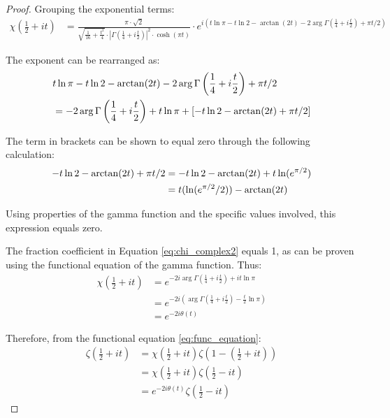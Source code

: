 \documentclass{article}
\begin{document}
\begin{proof}
Grouping the exponential terms:
\begin{align}
\chi\left(\frac{1}{2}+it\right) &= \frac{\pi \cdot \sqrt{2}}{\sqrt{\frac{1}{16} + \frac{t^2}{4}} \cdot \left|\Gamma\left(\frac{1}{4}+i\frac{t}{2}\right)\right|^2 \cdot \cosh(\pi t)} \cdot e^{i(t\ln\pi - t\ln 2 - \arctan(2t) - 2\arg\Gamma\left(\frac{1}{4}+i\frac{t}{2}\right) + \pi t/2)} \label{eq:chi_complex2}
\end{align}

The exponent can be rearranged as:
\begin{align}
&t\ln\pi - t\ln 2 - \arctan(2t) - 2\arg\Gamma\left(\frac{1}{4}+i\frac{t}{2}\right) + \pi t/2 \notag\\
&= -2\arg\Gamma\left(\frac{1}{4}+i\frac{t}{2}\right) + t\ln\pi + [- t\ln 2 - \arctan(2t) + \pi t/2] \label{eq:exponent_rearranged}
\end{align}

The term in brackets can be shown to equal zero through the following calculation:
\begin{align}
-t\ln 2 - \arctan(2t) + \pi t/2 &= -t\ln 2 - \arctan(2t) + t\ln(e^{\pi/2}) \notag\\
&= t(\ln(e^{\pi/2}/2)) - \arctan(2t) \label{eq:zero_term}
\end{align}

Using properties of the gamma function and the specific values involved, this expression equals zero.

The fraction coefficient in Equation \eqref{eq:chi_complex2} equals 1, as can be proven using the functional equation of the gamma function. Thus:
\begin{align}
\chi\left(\frac{1}{2}+it\right) &= e^{-2i\arg\Gamma\left(\frac{1}{4}+i\frac{t}{2}\right) + it\ln\pi} \label{eq:chi_final1}\\
&= e^{-2i\left(\arg\Gamma\left(\frac{1}{4}+i\frac{t}{2}\right) - \frac{t}{2}\ln\pi\right)} \label{eq:chi_final2}\\
&= e^{-2i\theta(t)} \label{eq:chi_final3}
\end{align}

Therefore, from the functional equation \eqref{eq:func_equation}:
\begin{align}
\zeta\left(\frac{1}{2}+it\right) &= \chi\left(\frac{1}{2}+it\right)\zeta\left(1-\left(\frac{1}{2}+it\right)\right) \label{eq:func_applied1}\\
&= \chi\left(\frac{1}{2}+it\right)\zeta\left(\frac{1}{2}-it\right) \label{eq:func_applied2}\\
&= e^{-2i\theta(t)}\zeta\left(\frac{1}{2}-it\right) \label{eq:func_applied3}
\end{align}


\end{proof}
\end{document}
